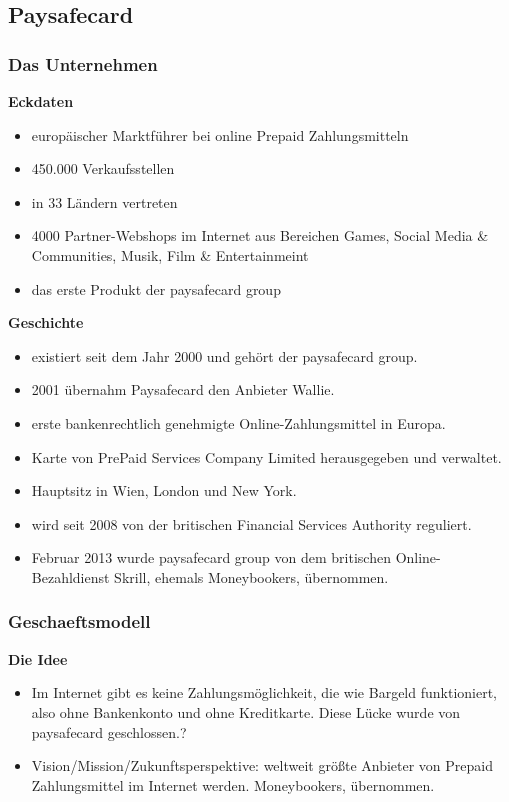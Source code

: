 \subsection{Paysafecard}
\subsubsection{Das Unternehmen}

\textbf{Eckdaten}


\begin{itemize}
        \item europäischer Marktführer bei online Prepaid Zahlungsmitteln
        \item 450.000 Verkaufsstellen
        \item in 33 Ländern vertreten
        \item 4000 Partner-Webshops im Internet aus Bereichen Games, Social Media \& Communities, Musik, Film \& Entertainmeint
        \item das erste Produkt der paysafecard group
\end{itemize}


\textbf{Geschichte}

\begin{itemize}
        \item existiert seit dem Jahr 2000 und gehört der paysafecard group.
        \item 2001 übernahm Paysafecard den Anbieter Wallie.
        \item erste bankenrechtlich genehmigte Online-Zahlungsmittel in Europa.
        \item Karte von PrePaid Services Company Limited herausgegeben und verwaltet.
        \item Hauptsitz in Wien, London und New York.
        \item wird seit 2008 von der britischen Financial Services Authority reguliert.
        \item Februar 2013 wurde paysafecard group von dem britischen Online-Bezahldienst Skrill, ehemals Moneybookers, übernommen.
\end{itemize}

\subsubsection{Geschaeftsmodell}
\textbf{Die Idee}

\begin{itemize}
        \item Im Internet gibt es keine Zahlungsmöglichkeit, die wie Bargeld funktioniert, also ohne Bankenkonto und ohne Kreditkarte. Diese Lücke wurde von paysafecard geschlossen.?
        \item Vision/Mission/Zukunftsperspektive:
weltweit größte Anbieter von Prepaid Zahlungsmittel im Internet werden. Moneybookers, übernommen.
\end{itemize}


